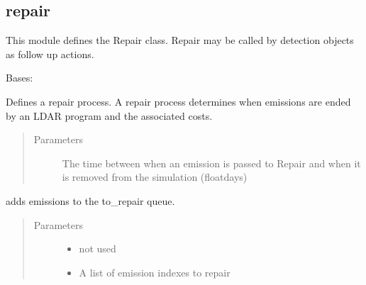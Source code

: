 \documentclass[letterpaper,10pt,english]{sphinxmanual}
\begin{document}
\subsection{repair}
\label{\detokenize{index:module-feast.DetectionModules.repair}}\label{\detokenize{index:repair}}
This module defines the Repair class. Repair may be called by detection objects as follow up actions.

\begin{fulllineitems}
\label{\detokenize{index:feast.DetectionModules.repair.Repair}}
Bases: 

Defines a repair process. A repair process determines when emissions are ended by an LDAR program and the
associated costs.
\begin{quote}\begin{description}
\item[{Parameters}] \leavevmode
{} \textendash{} The time between when an emission is passed to Repair and when it is removed from the
simulation (float\textendash{}days)

\end{description}\end{quote}

\begin{fulllineitems}
\label{\detokenize{index:feast.DetectionModules.repair.Repair.action}}
adds emissions to the to\_repair queue.
\begin{quote}\begin{description}
\item[{Parameters}] \leavevmode\begin{itemize}
\item {} 
 \textendash{} not used

\item {} 
 \textendash{} A list of emission indexes to repair


\end{itemize}
\end{description}
\end{quote}
\end{fulllineitems}
\end{fulllineitems}
\end{document}

